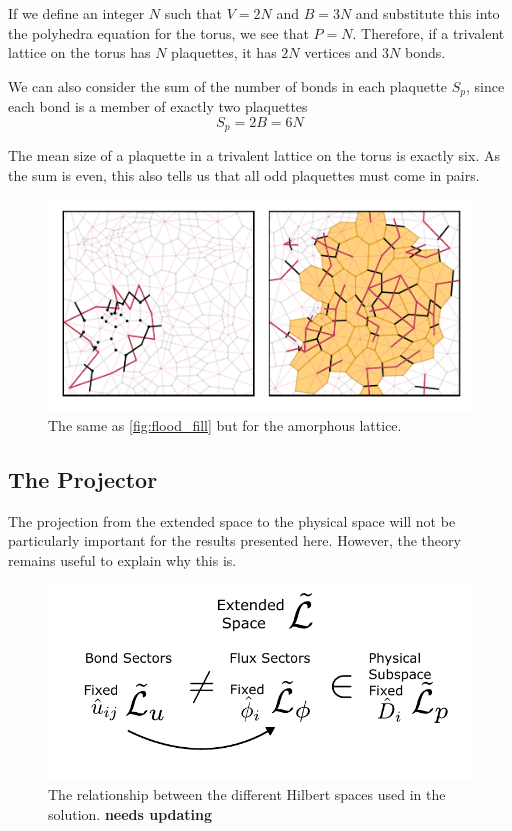 If we define an integer \(N\) such that \(V = 2N\) and \(B = 3N\) and substitute this into the polyhedra equation for the torus, we see that \(P = N\). Therefore, if a trivalent lattice on the torus has \(N\) plaquettes, it has \(2N\) vertices and \(3N\) bonds.

We can also consider the sum of the number of bonds in each plaquette \(S_p\), since each bond is a member of exactly two plaquettes \[S_p = 2B = 6N\]

The mean size of a plaquette in a trivalent lattice on the torus is exactly six. As the sum is even, this also tells us that all odd plaquettes must come in pairs.

\begin{figure}
\hypertarget{fig:flood_fill_amorphous}{%
\centering
\includegraphics[width=1\textwidth,height=\textheight]{figure_code/amk_chapter/intro/flood_fill_amorphous/flood_fill_amorphous.pdf}
\caption{The same as \cref{fig:flood_fill} but for the amorphous lattice.}\label{fig:flood_fill_amorphous}
}
\end{figure}

\hypertarget{the-projector}{%
\subsection{The Projector}\label{the-projector}}

The projection from the extended space to the physical space will not be particularly important for the results presented here. However, the theory remains useful to explain why this is.

\begin{figure}
\hypertarget{fig:hilbert_spaces}{%
\centering
\includegraphics[width=1\textwidth,height=\textheight]{figure_code/amk_chapter/hilbert_spaces.pdf}
\caption{The relationship between the different Hilbert spaces used in the solution. \textbf{needs updating}}\label{fig:hilbert_spaces}
}
\end{figure}

